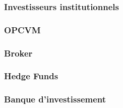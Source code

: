 \subsubsection{Investisseurs institutionnels}

\subsubsection{OPCVM}

\subsubsection{Broker}

\subsubsection{Hedge Funds}

\subsubsection{Banque d'investissement}